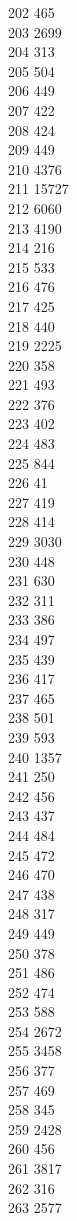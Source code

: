 { 202	465 \\
 203	2699 \\
 204	313 \\
 205	504 \\
 206	449 \\
 207	422 \\
 208	424 \\
 209	449 \\
 210	4376 \\
 211	15727 \\
 212	6060 \\
 213	4190 \\
 214	216 \\
 215	533 \\
 216	476 \\
 217	425 \\
 218	440 \\
 219	2225 \\
 220	358 \\
 221	493 \\
 222	376 \\
 223	402 \\
 224	483 \\
 225	844 \\
 226	41 \\
 227	419 \\
 228	414 \\
 229	3030 \\
 230	448 \\
 231	630 \\
 232	311 \\
 233	386 \\
 234	497 \\
 235	439 \\
 236	417 \\
 237	465 \\
 238	501 \\
 239	593 \\
 240	1357 \\
 241	250 \\
 242	456 \\
 243	437 \\
 244	484 \\
 245	472 \\
 246	470 \\
 247	438 \\
 248	317 \\
 249	449 \\
 250	378 \\
 251	486 \\
 252	474 \\
 253	588 \\
 254	2672 \\
 255	3458 \\
 256	377 \\
 257	469 \\
 258	345 \\
 259	2428 \\
 260	456 \\
 261	3817 \\
 262	316 \\
 263	2577 \\
}

